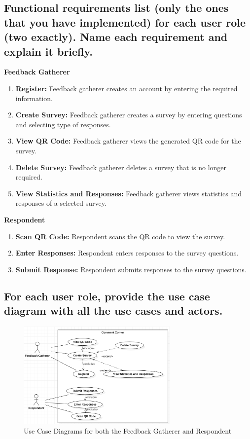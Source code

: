 \documentclass[letterpaper, 12 pt, conference]{ieeeconf}
\begin{document}
\subsection{Functional requirements list (only the ones that you have implemented) for each user role (two exactly). Name each requirement and explain it briefly.}
\linebreak

\textbf{Feedback Gatherer}
\begin{enumerate}
   \item \textbf{Register:} Feedback gatherer creates an account by entering the required information. 
   \item \textbf{Create Survey:} Feedback gatherer creates a survey by entering questions and selecting type of responses.
   \item \textbf{View QR Code:} Feedback gatherer views the generated QR code for the survey.
   \item \textbf{Delete Survey:} Feedback gatherer deletes a survey that is no longer required.
   \item \textbf{View Statistics and Responses:} Feedback gatherer views statistics and responses of a selected survey.
\end{enumerate}

\newline 
\hfill \break

\textbf{Respondent}
\begin{enumerate}
   \item \textbf{Scan QR Code:} Respondent scans the QR code to view the survey.
   \item \textbf{Enter Responses:} Respondent enters responses to the survey questions.
   \item \textbf{Submit Response:} Respondent submits responses to the survey questions.
\end{enumerate}

\newpage

\subsection{For each user role, provide the use case diagram with all the use cases and actors.}

\hfill \break
\begin{figure}[h]
\centering
\includegraphics[width=0.70\textwidth]{caseDiagram.png}
\caption{Use Case Diagrams for both the Feedback Gatherer and Respondent}
\end{figure}
\end{document}
